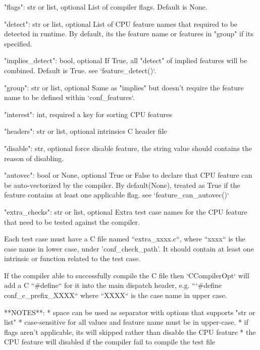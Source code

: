 \begin{DoxyVerb}
    "flags": str or list, optional
        List of compiler flags. Default is None.

    "detect": str or list, optional
        List of CPU feature names that required to be detected
        in runtime. By default, its the feature name or features
        in "group" if its specified.

    "implies_detect": bool, optional
        If True, all "detect" of implied features will be combined.
        Default is True. see `feature_detect()`.

    "group": str or list, optional
        Same as "implies" but doesn't require the feature name to be
        defined within `conf_features`.

    "interest": int, required
        a key for sorting CPU features

    "headers": str or list, optional
        intrinsics C header file

    "disable": str, optional
        force disable feature, the string value should contains the
        reason of disabling.

    "autovec": bool or None, optional
        True or False to declare that CPU feature can be auto-vectorized
        by the compiler.
        By default(None), treated as True if the feature contains at
        least one applicable flag. see `feature_can_autovec()`

    "extra_checks": str or list, optional
        Extra test case names for the CPU feature that need to be tested
        against the compiler.

        Each test case must have a C file named ``extra_xxxx.c``, where
        ``xxxx`` is the case name in lower case, under 'conf_check_path'.
        It should contain at least one intrinsic or function related to the test case.

        If the compiler able to successfully compile the C file then `CCompilerOpt`
        will add a C ``#define`` for it into the main dispatch header, e.g.
        ```#define {conf_c_prefix}_XXXX`` where ``XXXX`` is the case name in upper case.

    **NOTES**:
        * space can be used as separator with options that supports "str or list"
        * case-sensitive for all values and feature name must be in upper-case.
        * if flags aren't applicable, its will skipped rather than disable the
          CPU feature
        * the CPU feature will disabled if the compiler fail to compile
          the test file
\end{DoxyVerb}
 

